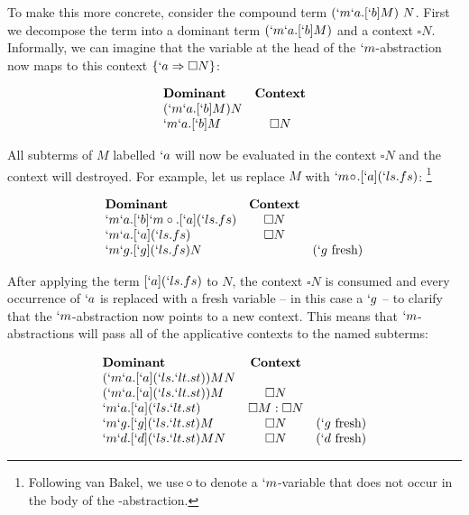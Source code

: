   To make this more concrete, consider the compound term $(`m`a.[`b]M)\ N$. 
  First we decompose the term into a dominant term $(`m`a.[`b]M)$ and a 
  context $\square N$. Informally, we can imagine that the variable at the head of the $`m$-abstraction now maps to this context $\{`a \Rightarrow \square N\}$:
  
  \begin{example}[]
    \[
    \begin{array}{lc}
    \textbf{Dominant} & \textbf{Context} \\
    (`m`a.[`b]M) N \\
    `m`a.[`b]M & \square N \\
    \end{array}
    \]
  \end{example}

  All subterms of $M$ labelled $`a$ will now be evaluated in the context 
  $\square N$ and the context will destroyed. For example, let us replace 
  $M$ with \mbox{$`m\!\circ\!.[`a](`ls.fs)$}:
  \footnote{Following van Bakel, we use $\!\circ\!$ to denote a $`m$-variable that does not occur in the body of the \lmu-abstraction.}
  
  \begin{example}
    \[
    \begin{array}{lcr}
    \textbf{Dominant} & \textbf{Context} \\
    `m`a.[`b]`m\circ.[`a](`ls.fs)    & \square N \\
    `m`a.[`a](`ls.fs)    & \square N \\
    `m`g.[`g](`ls.fs)N   & & (`g\ \text{fresh})  \\
    \end{array}
    \]
  \end{example}

  After applying the term $[`a](`ls.fs)$ to $N$, 
  the context $\square N$ is consumed and every occurrence of $`a$ is replaced with a fresh variable 
  -- in this case a $`g$ -- 
  to clarify that the $`m$-abstraction now points to a new context. 
  This means that $`m$-abstractions will pass all of the applicative contexts to the named subterms:
  
  \begin{example}
    \[
    \begin{array}{lcr}
    \textbf{Dominant} & \textbf{Context} \\
    (`m`a.[`a](`ls.`lt.st)) M N \\
    (`m`a.[`a](`ls.`lt.st))M & \square N \\
    `m`a.[`a](`ls.`lt.st) & \square M:\square N \\
    `m`g.[`g](`ls.`lt.st)M & \square N & (`g\ \text{fresh}) \\
    `m`d.[`d](`ls.`lt.st)MN & \square N & (`d\ \text{fresh}) \\
    \end{array}
    \]
  \end{example}
  
